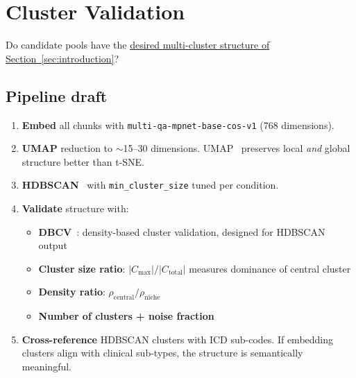 \documentclass[11pt,a4paper]{article}
\newcommand{\field}[1]{\nolinkurl{#1}}
\begin{document}
\section{Cluster Validation}
\label{sec:validation}

Do candidate pools have the \hyperref[sec:introduction]{desired multi-cluster structure of Section~\ref*{sec:introduction}}?

\subsection{Pipeline draft}

\begin{enumerate}[leftmargin=*]
	\item \textbf{Embed} all chunks with \texttt{multi-qa-mpnet-base-cos-v1}
	      (768 dimensions).

	\item \textbf{UMAP} reduction to $\sim$15--30 dimensions.  UMAP~\cite{mcinnes2018umap} preserves local \emph{and} global structure better than t-SNE.

	\item \textbf{HDBSCAN}~\cite{campello2013hdbscan} with \field{min\_cluster\_size} tuned per condition.

	\item \textbf{Validate} structure with:
	      \begin{itemize}[itemsep=2pt, parsep=1pt]
		      \item \textbf{DBCV}~\cite{moulavi2014dbcv}: density-based cluster
		            validation, designed for HDBSCAN output
		      \item \textbf{Cluster size ratio}: $|C_{\max}| / |C_{\text{total}}|$
		            measures dominance of central cluster
		      \item \textbf{Density ratio}: $\rho_{\text{central}} / \rho_{\text{niche}}$
		      \item \textbf{Number of clusters + noise fraction}
	      \end{itemize}

	\item \textbf{Cross-reference} HDBSCAN clusters with ICD sub-codes.  If embedding clusters align with clinical sub-types, the structure is semantically meaningful.
\end{enumerate}
\end{document}
